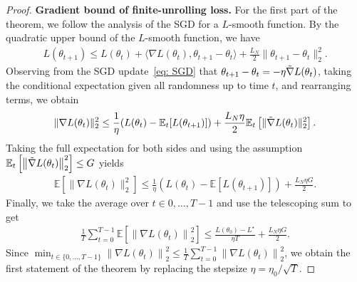\documentclass{article}
\def\E{\mathbb{E}}
\def\tgrad{\Tilde{\nabla}}
\begin{document}
\begin{proof} 
    \textbf{Gradient bound of finite-unrolling loss. } For the first part of the theorem, we follow the analysis of the SGD for a $L$-smooth function. 
    By the quadratic upper bound of the $L$-smooth function, we have 
    \begin{align*}
        L(\theta_{t+1})  \leq L(\theta_t) + \langle \nabla L(\theta_t), \theta_{t+1} - \theta_t \rangle  + \frac{L_N}{2} \| \theta_{t+1} - \theta_t \|^2_2.
    \end{align*}
    Observing from the SGD update~\eqref{eq: SGD} that $\theta_{t+1} - \theta_{t} = -\eta \tgrad L(\theta_t)$, taking the conditional expectation given all randomness up to time $t$, and rearranging terms, 
    we obtain 
    \begin{align*}
        \| \nabla L(\theta_t) \|^2_2  \leq \frac{1}{\eta}(L(\theta_t) -  \E_t [L(\theta_{t+1})])  + \frac{L_N \eta}{2} \E_t \left[\| \tgrad L(\theta_t) \|^2_2  \right].
    \end{align*}
    Taking the full expectation for both sides and using the assumption $\mathbb{E}_t \left[ \left\| \tgrad L(\theta_t) \right\|^2_2 \right] \leq G$ yields
    \begin{align*}
        \E \left[ \| \nabla L(\theta_t) \|^2_2 \right] \leq \frac{1}{\eta}(L(\theta_t) -  \E [L(\theta_{t+1})])  + \frac{L_N  \eta G }{2}.
    \end{align*}
    Finally, we take the average over $ t\in {0, \dots, T - 1}$ and use the telescoping sum to get 
    \begin{align*}
        \frac{1}{T} \sum_{t=0}^{T-1} \mathbb{E} \left[ \left\| \nabla L(\theta_t) \right\|^2_2 \right] \leq \frac{ L(\theta_0) - L^\star}{\eta T} + \frac{L_N  \eta G }{2}.
    \end{align*} 
    Since $\min_{t \in \{0, \dots, T-1\}} \left\| \nabla L(\theta_t) \right\|^2_2 \leq  \frac{1}{T} \sum_{t=0}^{T-1} \left\| \nabla L(\theta_t) \right\|^2_2$, we obtain the first statement of the theorem by replacing the stepsize $\eta = \eta_0 / \sqrt{T}$.
    

\end{proof}
\end{document}
